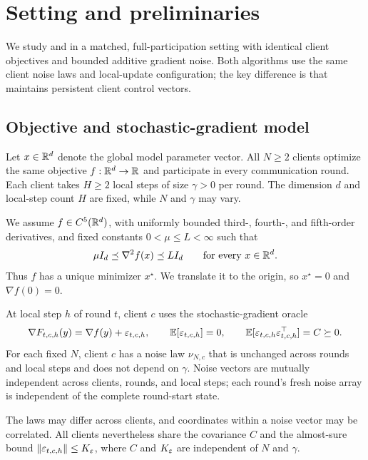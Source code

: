 \section{Setting and preliminaries}
\label{sec:setting}

We study \Scaf{} and \FedAvg{} in a matched, full-participation setting with identical client objectives and bounded additive gradient noise. Both algorithms use the same client noise laws and local-update configuration; the key difference is that \Scaf{} maintains persistent client control vectors.

\subsection{Objective and stochastic-gradient model}

Let $x\in\mathbb{R}^d$ denote the global model parameter vector. All $N\geq2$ clients optimize the same objective $f:\mathbb{R}^d\to\mathbb{R}$ and participate in every communication round. Each client takes $H\geq2$ local steps of size $\gamma>0$ per round. The dimension $d$ and local-step count $H$ are fixed, while $N$ and $\gamma$ may vary.

We assume $f\in C^5(\mathbb{R}^d)$, with uniformly bounded third-, fourth-, and fifth-order derivatives, and fixed constants $0<\mu\leq L<\infty$ such that
\begin{equation}
\label{eq:setting-regularity}
\mu I_d\preceq\nabla^2 f(x)\preceq LI_d
\qquad\text{for every }x\in\mathbb{R}^d.
\end{equation}
Thus $f$ has a unique minimizer $x^\star$. We translate it to the origin, so $x^\star=0$ and $\nabla f(0)=0$.

At local step $h$ of round $t$, client $c$ uses the stochastic-gradient oracle
\begin{equation}
\label{eq:additive-oracle}
\nabla F_{t,c,h}(y)=\nabla f(y)+\varepsilon_{t,c,h},\qquad
\mathbb{E}[\varepsilon_{t,c,h}]=0,\qquad
\mathbb{E}[\varepsilon_{t,c,h}\varepsilon_{t,c,h}^{\top}]=C\succeq0.
\end{equation}
For each fixed $N$, client $c$ has a noise law $\nu_{N,c}$ that is unchanged across rounds and local steps and does not depend on $\gamma$. Noise vectors are mutually independent across clients, rounds, and local steps; each round's fresh noise array is independent of the complete round-start state.

The laws may differ across clients, and coordinates within a noise vector may be correlated. All clients nevertheless share the covariance $C$ and the almost-sure bound $\|\varepsilon_{t,c,h}\|\leq K_\varepsilon$, where $C$ and $K_\varepsilon$ are independent of $N$ and $\gamma$.

